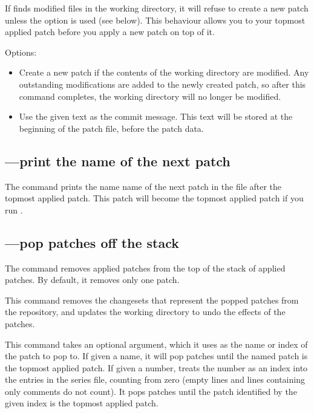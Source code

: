 If  finds modified files in the working directory, it will
refuse to create a new patch unless the  option is
used (see below).  This behaviour allows you to  your
topmost applied patch before you apply a new patch on top of it.

Options:
\begin{itemize}
\item[\hgxopt{mq}{qnew}{-f}] Create a new patch if the contents of the
  working directory are modified.  Any outstanding modifications are
  added to the newly created patch, so after this command completes,
  the working directory will no longer be modified.
\item[\hgxopt{mq}{qnew}{-m}] Use the given text as the commit message.
  This text will be stored at the beginning of the patch file, before
  the patch data.
\end{itemize}

\subsection{---print the name of the next patch}

The  command prints the name name of the next patch in
the  file after the topmost applied patch.  This
patch will become the topmost applied patch if you run .

\subsection{---pop patches off the stack}

The  command removes applied patches from the top of the
stack of applied patches.  By default, it removes only one patch.

This command removes the changesets that represent the popped patches
from the repository, and updates the working directory to undo the
effects of the patches.

This command takes an optional argument, which it uses as the name or
index of the patch to pop to.  If given a name, it will pop patches
until the named patch is the topmost applied patch.  If given a
number,  treats the number as an index into the entries in
the series file, counting from zero (empty lines and lines containing
only comments do not count).  It pops patches until the patch
identified by the given index is the topmost applied patch.

